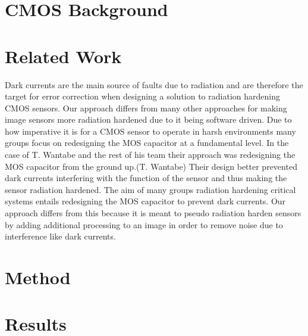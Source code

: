 \documentclass[journal]{IEEEtran}
\begin{document}
\section{CMOS Background}


\section{Related Work} 
Dark currents are the main source of faults due to radiation and are therefore the target for error correction when designing a solution to radiation hardening CMOS sensors.  Our approach differs from many other approaches for making image sensors more radiation hardened due to it being software driven.  Due to how imperative it is for a CMOS sensor to operate in harsh environments many groups focus on redesigning the MOS capacitor at a fundamental level.  In the case of T. Wantabe and the rest of his team their approach was redesigning the MOS capacitor from the ground up.(T. Wantabe)  Their design better prevented dark currents interfering with the function of the sensor and thus making the sensor radiation hardened.  The aim of many groups radiation hardening critical systems entails redesigning the MOS capacitor to prevent dark currents.  Our approach differs from this because it is meant to pseudo radiation harden sensors by adding additional processing to an image in order to remove noise due to interference like dark currents.  

\section{Method}

\section{Results}



{\footnotesize

}
\end{document}

